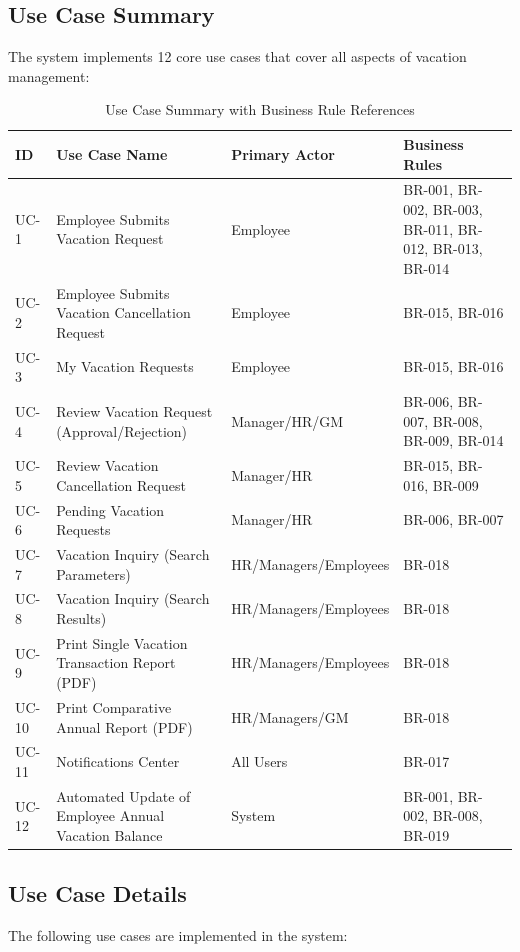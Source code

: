 \documentclass[12pt,a4paper]{article}
\begin{document}
\subsection{Use Case Summary}
The system implements 12 core use cases that cover all aspects of vacation management:

\begin{table}[H]
\centering
\begin{tabular}{|p{1cm}|p{4cm}|p{3cm}|p{3cm}|}
\hline
\textbf{ID} & \textbf{Use Case Name} & \textbf{Primary Actor} & \textbf{Business Rules} \\
\hline
UC-1 & Employee Submits Vacation Request & Employee & BR-001, BR-002, BR-003, BR-011, BR-012, BR-013, BR-014 \\
\hline
UC-2 & Employee Submits Vacation Cancellation Request & Employee & BR-015, BR-016 \\
\hline
UC-3 & My Vacation Requests & Employee & BR-015, BR-016 \\
\hline
UC-4 & Review Vacation Request (Approval/Rejection) & Manager/HR/GM & BR-006, BR-007, BR-008, BR-009, BR-014 \\
\hline
UC-5 & Review Vacation Cancellation Request & Manager/HR & BR-015, BR-016, BR-009 \\
\hline
UC-6 & Pending Vacation Requests & Manager/HR & BR-006, BR-007 \\
\hline
UC-7 & Vacation Inquiry (Search Parameters) & HR/Managers/Employees & BR-018 \\
\hline
UC-8 & Vacation Inquiry (Search Results) & HR/Managers/Employees & BR-018 \\
\hline
UC-9 & Print Single Vacation Transaction Report (PDF) & HR/Managers/Employees & BR-018 \\
\hline
UC-10 & Print Comparative Annual Report (PDF) & HR/Managers/GM & BR-018 \\
\hline
UC-11 & Notifications Center & All Users & BR-017 \\
\hline
UC-12 & Automated Update of Employee Annual Vacation Balance & System & BR-001, BR-002, BR-008, BR-019 \\
\hline
\end{tabular}
\caption{Use Case Summary with Business Rule References}
\end{table}

\subsection{Use Case Details}
The following use cases are implemented in the system:
\end{document}

